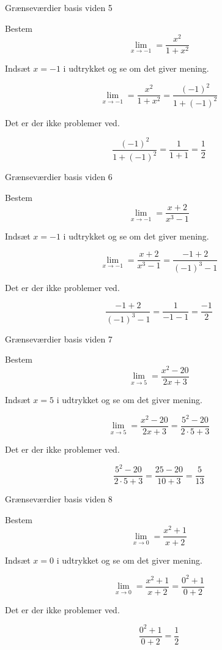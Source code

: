 \documentclass{article}
\begin{document}
\newpage
\begin{exercise}{Grænseværdier basis viden 5}
	
	Bestem \[\lim_{x \to -1} = \frac{x^2}{1+x^2}\]
	
	
	
	\hint
	Indsæt $x=-1$ i udtrykket og se om det giver mening.
	
	\hint
	\[
	\lim_{x \to -1} = \frac{x^2}{1+x^2} = \frac{(-1)^2}{1 + (-1)^2}
	\]
	
	\hint 
	Det er der ikke problemer ved.
	
	\hint
	\[
	\frac{(-1)^2}{1 + (-1)^2} = \frac{1}{1+1} = \frac{1}{2}
	\]
	
\end{exercise}

\newpage
\begin{exercise}{Grænseværdier basis viden 6}
	
	Bestem \[\lim_{x \to -1} = \frac{x+2}{x^3-1}\]
	
	
	
	\hint
	Indsæt $x=-1$ i udtrykket og se om det giver mening.
	
	\hint
	\[
	\lim_{x \to -1} = \frac{x+2}{x^3-1} = \frac{-1+2}{(-1)^3 -1}
	\]
	
	\hint 
	Det er der ikke problemer ved.
	
	\hint
	\[
	 \frac{-1+2}{(-1)^3 -1} = \frac{1}{-1-1} = \frac{-1}{2}
	\]
	
\end{exercise}

\newpage
\begin{exercise}{Grænseværdier basis viden 7}
	
	Bestem \[\lim_{x \to 5} = \frac{x^2-20}{2x+3}\]
	
	
	
	\hint
	Indsæt $x=5$ i udtrykket og se om det giver mening.
	
	\hint
	\[
	\lim_{x \to 5} = \frac{x^2-20}{2x+3} = \frac{5^2-20}{2 \cdot 5 +3}
	\]
	
	\hint 
	Det er der ikke problemer ved.
	
	\hint
	\[
	\frac{5^2-20}{2 \cdot 5 +3} = \frac{25-20}{10+3} = \frac{5}{13}	
	\]
	
\end{exercise}

\newpage
\begin{exercise}{Grænseværdier basis viden 8}
	
	Bestem \[\lim_{x \to 0} = \frac{x^2+1}{x+2}\]
	
	
	
	\hint
	Indsæt $x=0$ i udtrykket og se om det giver mening.
	
	\hint
	\[
	\lim_{x \to 0} = \frac{x^2+1}{x+2} = \frac{0^2+1}{0+2}
	\]
	
	\hint 
	Det er der ikke problemer ved.
	
	\hint
	\[
	 \frac{0^2+1}{0+2} = \frac{1}{2}
	\]
	
\end{exercise}

\newpage
\end{document}
